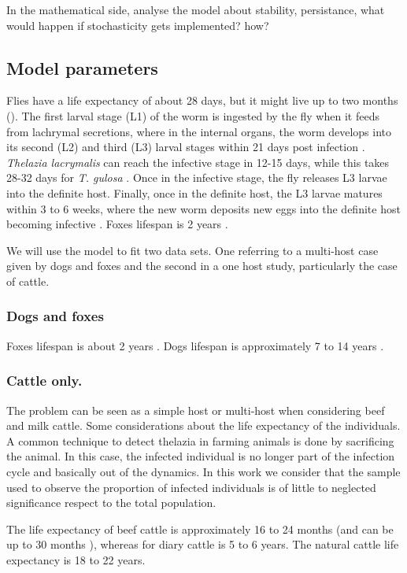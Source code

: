 \documentclass[preprint,12pt]{elsarticle}
\begin{document}
\noindent In the mathematical side, analyse the model about stability, persistance, what would happen if stochasticity gets implemented? how?

\subsection{Model parameters}
\noindent Flies have a life expectancy of about 28 days, but it might live up to two months (\cite{sanchez:1998}). The first larval stage (L1) of the worm is ingested by the fly when it feeds from lachrymal secretions, where in the internal organs, the worm develops into its second (L2) and third (L3) larval stages within 21 days post infection \cite{Otranto:2003}. \textit{Thelazia lacrymalis} can reach the infective stage in 12-15 days, while this takes 28-32 days for \textit{T. gulosa} \cite{Chanie:2014}. Once in the infective stage, the fly releases L3 larvae into the definite host. Finally, once in the definite host, the L3 larvae matures within 3 to 6 weeks, where the new worm deposits new eggs into the definite host becoming infective \cite{Chanie:2014}. Foxes lifespan is 2 years \cite{Devenish:2014}.

\noindent We will use the model to fit two data sets. One referring to a multi-host case given
by dogs and foxes and the second in a one host study, particularly the case of cattle.
\subsubsection{Dogs and foxes}
\noindent Foxes lifespan is about 2 years \cite{Devenish:2014}. Dogs lifespan is approximately 7 to 14 years \cite{selman:2013}.

\subsubsection{Cattle only.}
\noindent The problem can be seen as a simple host or multi-host when considering beef and milk cattle.
\noindent Some considerations about the life expectancy of the individuals. A common technique 
to detect thelazia in farming animals is done by sacrificing the animal. In this case, the infected individual is no longer part of the infection cycle and basically out of the dynamics.
In this work we consider that the sample used to observe the proportion of infected individuals is of little to neglected significance respect to the total population.

\noindent The life expectancy of beef cattle is approximately 16 to 24 months (and can be up to 30 months \cite{stanley:2003}), whereas for diary cattle is 5 to 6 years. The natural cattle life expectancy is 18 to 22 years.
\end{document}
